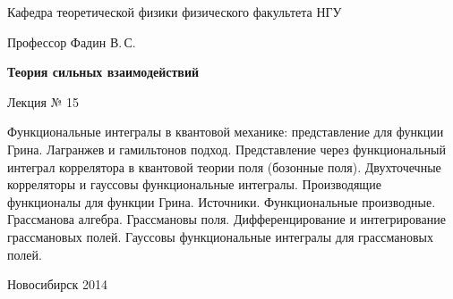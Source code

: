 \documentclass[12pt,pagesize,paper=landscape,paper=192mm:108mm]{scrbook}
\begin{document}
\begin{titlepage}
\begin{center}
    Кафедра теоретической физики физического факультета НГУ
    \medskip

    \Large
    Профессор Фадин В.\,С.

    \huge
    \textbf{Теория сильных взаимодействий}
    \smallskip
    
    \Large
    Лекция № 15
    \vfill
    
    \normalsize
    \begin{minipage}{0.78\linewidth}
      Функциональные интегралы в квантовой механике: представление для
      функции Грина. Лагранжев и гамильтонов подход. Представление
      через функциональный интеграл коррелятора в квантовой теории
      поля (бозонные поля). Двухточечные корреляторы и гауссовы
      функциональные интегралы. Производящие функционалы для функции
      Грина. Источники. Функциональные производные. Грассманова
      алгебра. Грассмановы поля. Дифференцирование и интегрирование
      грассмановых полей. Гауссовы функциональные интегралы для
      грассмановых полей.
    \end{minipage}
    \vfill
    
    \normalsize \ccbysa\hspace{0.5em}  Новосибирск 2014   
  \end{center}
\end{titlepage}
\end{document}
